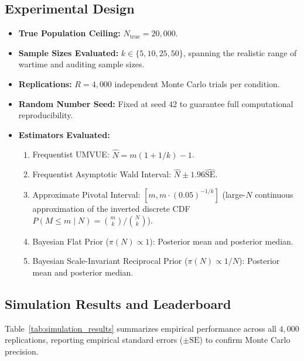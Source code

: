 \documentclass[10pt,a4paper]{article}
\begin{document}
\subsection{Experimental Design}
\begin{itemize}
    \item \textbf{True Population Ceiling:} $N_{\text{true}} = 20,000$.
    \item \textbf{Sample Sizes Evaluated:} $k \in \{5, 10, 25, 50\}$, spanning the realistic range of wartime and auditing sample sizes.
    \item \textbf{Replications:} $R = 4,000$ independent Monte Carlo trials per condition.
    \item \textbf{Random Number Seed:} Fixed at seed 42 to guarantee full computational reproducibility.
    \item \textbf{Estimators Evaluated:}
    \begin{enumerate}
        \item Frequentist UMVUE: $\hat{N} = m(1 + 1/k) - 1$.
        \item Frequentist Asymptotic Wald Interval: $\hat{N} \pm 1.96 \widehat{\text{SE}}$.
        \item Approximate Pivotal Interval: $[m, m \cdot (0.05)^{-1/k}]$ (large-$N$ continuous approximation of the inverted discrete CDF $P(M \le m \mid N) = \binom{m}{k}/\binom{N}{k}$).
        \item Bayesian Flat Prior ($\pi(N) \propto 1$): Posterior mean and posterior median.
        \item Bayesian Scale-Invariant Reciprocal Prior ($\pi(N) \propto 1/N$): Posterior mean and posterior median.
    \end{enumerate}
\end{itemize}

\subsection{Simulation Results and Leaderboard}
Table~\ref{tab:simulation_results} summarizes empirical performance across all $4,000$ replications, reporting empirical standard errors ($\pm \text{SE}$) to confirm Monte Carlo precision.
\end{document}
